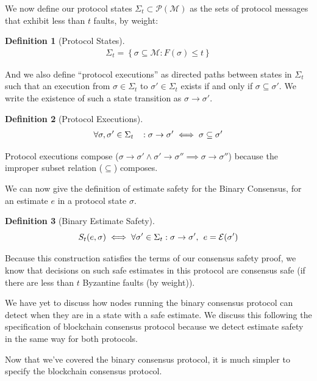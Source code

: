 \documentclass{article}
\theoremstyle{definition}
\newtheorem{defn}{Definition}[section]
\begin{document}
We now define our protocol states $\Sigma_t \subset \mathcal{P}(\mathcal{M})$ as the sets of protocol messages that exhibit less than $t$ faults, by weight:

\begin{defn}[Protocol States]
\begin{align}
\Sigma_t = \left\{\sigma \subseteq \mathcal{M}: F(\sigma) \leq t \right\}
\end{align}
\end{defn}

And we also define ``protocol executions'' as directed paths between states in $\Sigma_t$ such that an execution from $\sigma \in \Sigma_t$ to $\sigma' \in \Sigma_t$ exists if and only if $\sigma \subseteq \sigma'$. We write the existence of such a state transition as $\sigma \to \sigma'$.

\begin{defn}[Protocol Executions]
\begin{align}
\forall \sigma, \sigma' \in \Sigma_t \hspace{3mm} : \sigma \to \sigma' \iff \sigma \subseteq \sigma'
\end{align}
\end{defn}

Protocol executions compose ($\sigma \to \sigma' \land \sigma' \to \sigma'' \implies \sigma \to \sigma''$) because the improper subset relation ($\subseteq$) composes.

We can now give the definition of estimate safety for the Binary Consensus, for an estimate $e$ in a protocol state $\sigma$.

\begin{defn}[Binary Estimate Safety]
$$
S_t(e, \sigma) \iff \forall \sigma' \in \Sigma_t: \sigma \to \sigma',\hspace{1.5mm} e = \mathcal{E}(\sigma')
$$
\end{defn}

Because this construction satisfies the terms of our consensus safety proof, we know that decisions on such safe estimates in this protocol are consensus safe (if there are less than $t$ Byzantine faults (by weight)).

We have yet to discuss how nodes running the binary consensus protocol can detect when they are in a state with a safe estimate. We discuss this following the specification of blockchain consensus protocol because we detect estimate safety in the same way for both protocols.

Now that we've covered the binary consensus protocol, it is much simpler to specify the blockchain consensus protocol.
\end{document}
